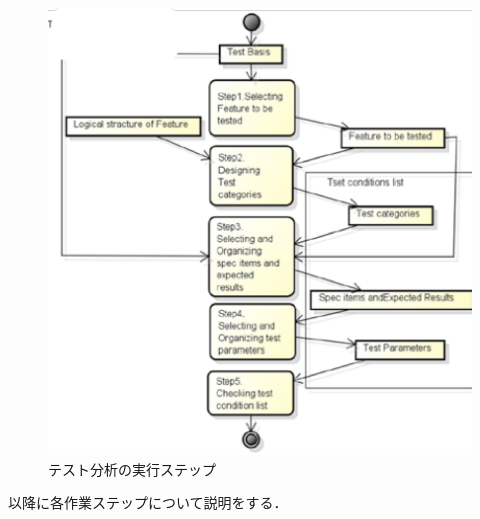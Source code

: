 \begin{figure}[htbp]
  \begin{center}
  \includegraphics[width=12cm]{./image/D-4-Fig3.png}
  \caption{テスト分析の実行ステップ}
  \label{fig:D-4-Fig3}
  \end{center}
   \end{figure}


以降に各作業ステップについて説明をする．

